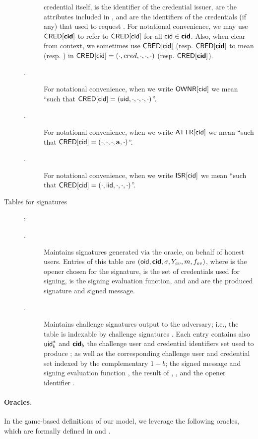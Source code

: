 \begin{description}
\begin{description}
    credential itself, \iid is the identifier of the credential issuer, \attrs
    are the attributes included in \cred, and \scid are the identifiers of the
    credentials (if any) that \uid used to request \cred. For notational
    convenience, we may use $\mathsf{CRED}[\boldsymbol{\mathsf{cid}}]$ to refer to $\mathsf{CRED}[\mathsf{cid}]$ for all
    $\mathsf{cid} \in \boldsymbol{\mathsf{cid}}$. Also, when clear from context, we sometimes use
    $\mathsf{CRED}[\mathsf{cid}]$ (resp. $\mathsf{CRED}[\boldsymbol{\mathsf{cid}}]$ to mean \cred (resp. \scred) in
    $\mathsf{CRED}[\mathsf{cid}] = (\cdot,cred,\cdot,\cdot,\cdot)$ (resp. $\mathsf{CRED}[\boldsymbol{\mathsf{cid}}]$).
  \item[\OWNR.] For notational convenience, when we write $\mathsf{OWNR}[\mathsf{cid}]$ we mean
    ``\uid such that $\mathsf{CRED}[\mathsf{cid}] = (\mathsf{uid}, \cdot, \cdot, \cdot, \cdot)$''.
  \item[\ATTR.] For notational convenience, when we write $\mathsf{ATTR}[\mathsf{cid}]$ we mean
    ``\attrs such that $\mathsf{CRED}[\mathsf{cid}] = (\cdot, \cdot, \cdot, \mathbf{a}, \cdot)$''.
  \item[\ISR.] For notational convenience, when we write $\mathsf{ISR}[\mathsf{cid}]$ we mean
    ``\iid such that $\mathsf{CRED}[\mathsf{cid}] = (\cdot, \mathsf{iid}, \cdot, \cdot, \cdot)$''.
  \end{description}
\item[Tables for signatures]:
  \begin{description}
  \item[\SIG.] Maintains signatures generated via the \SIGN oracle, on behalf
    of honest users. Entries of this table are $(\mathsf{oid},\boldsymbol{\mathsf{cid}},\sigma,Y_{ev},m,
    f_{ev})$, where \oid is the opener chosen for the signature, \scid is the
    set of credentials used for signing, \feval is the signing evaluation
    function, and \sig and \msg are the produced signature and signed message.
  \item[\CSIG.] Maintains challenge signatures output to the adversary; i.e.,
    the table is indexable by challenge signatures \csig.
    Each entry contains also $\mathsf{uid}^*_b$ and $\boldsymbol{\mathsf{cid}}_b$ the challenge user and
    credential identifiers set used to produce \csig; as well as the
    corresponding challenge user and credential set indexed by the complementary
    $1-b$; the signed message \msg and signing evaluation function \feval, the
    result of \feval, \yeval, and the opener identifier \oid.
  \end{description}
\end{description}

\paragraph{Oracles.} %
In the game-based definitions of our \UAS model, we leverage the following
oracles, which are formally defined in  and
. 

